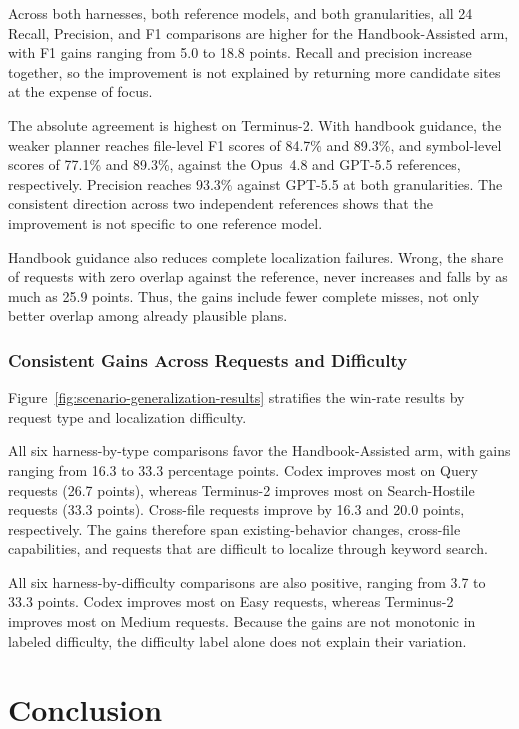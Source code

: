 \documentclass[]{ailab}
\begin{document}
Across both harnesses, both reference models, and both granularities, all 24
Recall, Precision, and F1 comparisons are higher for the Handbook-Assisted arm,
with F1 gains ranging from 5.0 to 18.8 points. Recall and precision increase
together, so the improvement is not explained by returning more candidate sites
at the expense of focus.

The absolute agreement is highest on Terminus-2. With handbook guidance, the
weaker planner reaches file-level F1 scores of 84.7\% and 89.3\%, and
symbol-level scores of 77.1\% and 89.3\%, against the Opus~4.8 and GPT-5.5
references, respectively. Precision reaches 93.3\% against GPT-5.5 at both
granularities. The consistent direction across two independent references shows
that the improvement is not specific to one reference model.

Handbook guidance also reduces complete localization failures. Wrong, the share
of requests with zero overlap against the reference, never increases and falls
by as much as 25.9 points. Thus, the gains include fewer complete misses, not
only better overlap among already plausible plans.

\subsubsection{Consistent Gains Across Requests and Difficulty}

Figure~\ref{fig:scenario-generalization-results} stratifies the win-rate results
by request type and localization difficulty.

All six harness-by-type comparisons favor the Handbook-Assisted arm, with gains
ranging from 16.3 to 33.3 percentage points. Codex improves most on Query
requests (26.7 points), whereas Terminus-2 improves most on Search-Hostile
requests (33.3 points). Cross-file requests improve by 16.3 and 20.0 points,
respectively. The gains therefore span existing-behavior changes, cross-file
capabilities, and requests that are difficult to localize through keyword
search.

All six harness-by-difficulty comparisons are also positive, ranging from 3.7
to 33.3 points. Codex improves most on Easy requests, whereas Terminus-2
improves most on Medium requests. Because the gains are not monotonic in labeled
difficulty, the difficulty label alone does not explain their variation.

\section{Conclusion}
\label{sec:conclusion}
\end{document}
